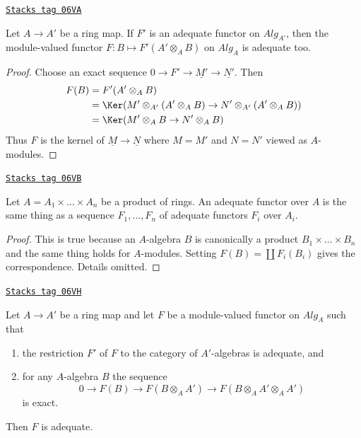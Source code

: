 \begin{lemma}
\label{adequate-lemma-pushforward-adequate}
\href{https://stacks.math.columbia.edu/tag/06VA}{\texttt{Stacks tag 06VA}}

Let $A \to A'$ be a ring map. If $F'$ is an adequate functor on
$\textit{Alg}_{A'}$, then the module-valued functor
$F : B \mapsto F'(A' \otimes_A B)$ on $\textit{Alg}_A$ is adequate too.
\end{lemma}

\begin{proof}
Choose an exact sequence $0 \to F' \to \underline{M'} \to \underline{N'}$.
Then
\begin{align*}
F(B) & = F'(A' \otimes_A B) \\
& = \Ker(M' \otimes_{A'} (
A' \otimes_A B) \to N' \otimes_{A'} (A' \otimes_A B)) \\
& = \Ker(M' \otimes_A B \to N' \otimes_A B)
\end{align*}
Thus $F$ is the kernel of
$\underline{M} \to \underline{N}$
where $M = M'$ and $N = N'$ viewed as $A$-modules.
\end{proof}

\begin{lemma}
\label{adequate-lemma-adequate-product}
\href{https://stacks.math.columbia.edu/tag/06VB}{\texttt{Stacks tag 06VB}}

Let $A = A_1 \times \ldots \times A_n$ be a product of rings.
An adequate functor over $A$ is the same thing as a sequence
$F_1, \ldots, F_n$ of adequate functors $F_i$ over $A_i$.
\end{lemma}

\begin{proof}
This is true because an $A$-algebra $B$ is canonically a product
$B_1 \times \ldots \times B_n$ and the same thing holds for $A$-modules.
Setting $F(B) = \coprod F_i(B_i)$ gives the correspondence.
Details omitted.
\end{proof}

\begin{lemma}
\label{adequate-lemma-adequate-descent}
\href{https://stacks.math.columbia.edu/tag/06VH}{\texttt{Stacks tag 06VH}}

Let $A \to A'$ be a ring map and let $F$ be a module-valued functor on
$\textit{Alg}_A$ such that
\begin{enumerate}
\item the restriction $F'$ of $F$ to the category of $A'$-algebras is
adequate, and
\item for any $A$-algebra $B$ the sequence
$$
0 \to F(B) \to F(B \otimes_A A') \to F(B \otimes_A A' \otimes_A A')
$$
is exact.
\end{enumerate}
Then $F$ is adequate.
\end{lemma}

